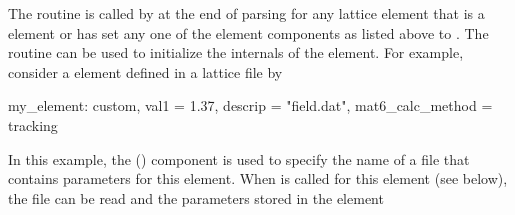 The  routine is called by 
at the end of parsing for any lattice element that is a  element or has set any one of
the element components as listed above to . The  routine can be used to
initialize the internals of the element. For example, consider a  element defined in a
lattice file by
\begin{example}
  my_element: custom, val1 = 1.37, descrip = "field.dat", mat6_calc_method = tracking
\end{example}
In this example, the  () component is used
to specify the name of a file that contains parameters for this
element. When  is called for this element (see below),
the file can be read and the parameters stored in the element
